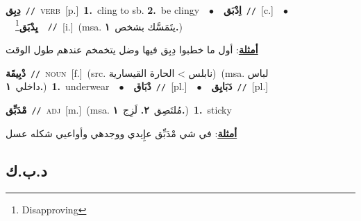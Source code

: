 \documentclass[10pt,a4paper,twoside]{article} %
\begin{document}
\begin{multicols}{2}
{\setlength\topsep{0pt}\textbf{\foreignlanguage{arabic}{دِبِق}}\ {\color{gray}\texttt{//}\color{black}}\ \textsc{verb}\ [p.]\ \textbf{1.}~cling to sb.  \textbf{2.}~be clingy\ \ $\bullet$\ \ \setlength\topsep{0pt}\textbf{\foreignlanguage{arabic}{اِدْبَق}}\ {\color{gray}\texttt{//}\color{black}}\ [c.]\ \ $\bullet$\ \ \setlength\topsep{0pt}\textbf{\foreignlanguage{arabic}{يِدْبَق}}\footnote{Disapproving}\ \ {\color{gray}\texttt{//}\color{black}}\ [i.]\ \color{gray}(msa. \foreignlanguage{arabic}{يتَمَسَّك بشخص}~\foreignlanguage{arabic}{\textbf{١.}})\color{black}\  \begin{flushright}\color{gray}\foreignlanguage{arabic}{\textbf{\underline{\foreignlanguage{arabic}{أمثلة}}}: أول ما خطبوا دِبِق فيها وضل يتخمخم عندهم طول الوقت}\end{flushright}\color{black}} \vspace{2mm}

{\setlength\topsep{0pt}\textbf{\foreignlanguage{arabic}{دْبِيقَة}}\ {\color{gray}\texttt{//}\color{black}}\ \textsc{noun}\ [f.]\ (src. \color{gray}\foreignlanguage{arabic}{نابلس > الحارة القيسارية}\color{black})\ \color{gray}(msa. \foreignlanguage{arabic}{لباس داخلي}~\foreignlanguage{arabic}{\textbf{١.}})\color{black}\ \textbf{1.}~underwear\ \ $\bullet$\ \ \setlength\topsep{0pt}\textbf{\foreignlanguage{arabic}{دْبَاق}}\ {\color{gray}\texttt{//}\color{black}}\ [pl.]\ \ $\bullet$\ \ \setlength\topsep{0pt}\textbf{\foreignlanguage{arabic}{دَبَايِق}}\ {\color{gray}\texttt{//}\color{black}}\ [pl.]\ } \vspace{2mm}

{\setlength\topsep{0pt}\textbf{\foreignlanguage{arabic}{مْدَبِّق}}\ {\color{gray}\texttt{//}\color{black}}\ \textsc{adj}\ [m.]\ \color{gray}(msa. \foreignlanguage{arabic}{مُلتَصِق}~\foreignlanguage{arabic}{\textbf{٢.}}  \foreignlanguage{arabic}{لَزِج}~\foreignlanguage{arabic}{\textbf{١.}})\color{black}\ \textbf{1.}~sticky\  \begin{flushright}\color{gray}\foreignlanguage{arabic}{\textbf{\underline{\foreignlanguage{arabic}{أمثلة}}}: في شي مْدَبِّق عإِيدي ووجدهي وأواعيي شكله عسل}\end{flushright}\color{black}} \vspace{2mm}

\vspace{-3mm}
\subsection*{\color{blue}\foreignlanguage{arabic}{د.ب.ك}\color{blue}{}} 


\end{multicols}
\end{document}
